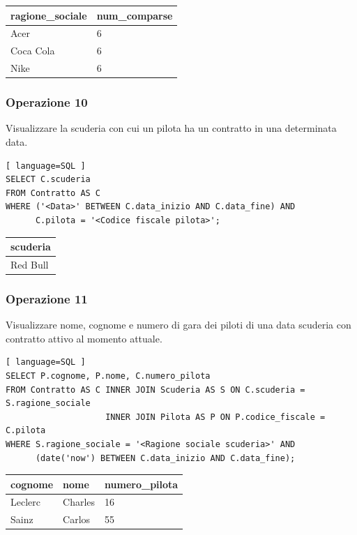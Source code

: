 \documentclass[11pt]{article}
\begin{document}
\begin{table}[H]
    \centering
    \begin{tabular}{|l|l|}
    \hline
        \textbf{ragione\_sociale} & \textbf{num\_comparse} \\ \hline
        Acer & 6 \\ \hline
        Coca Cola & 6 \\ \hline
        Nike & 6 \\ \hline
    \end{tabular}
\end{table}


\subsubsection{Operazione 10}
Visualizzare la scuderia con cui un pilota ha un contratto in una determinata data.
\begin{lstlisting}[ language=SQL ]
SELECT C.scuderia
FROM Contratto AS C
WHERE ('<Data>' BETWEEN C.data_inizio AND C.data_fine) AND
      C.pilota = '<Codice fiscale pilota>';
\end{lstlisting}

\begin{table}[H]
    \centering
    \begin{tabular}{|l|}
    \hline
        \textbf{scuderia} \\ \hline
        Red Bull \\ \hline
    \end{tabular}
\end{table}


\subsubsection{Operazione 11}
Visualizzare nome, cognome e numero di gara dei piloti di una data scuderia con contratto attivo al momento attuale.
\begin{lstlisting}[ language=SQL ]
SELECT P.cognome, P.nome, C.numero_pilota
FROM Contratto AS C INNER JOIN Scuderia AS S ON C.scuderia = S.ragione_sociale 
                    INNER JOIN Pilota AS P ON P.codice_fiscale = C.pilota
WHERE S.ragione_sociale = '<Ragione sociale scuderia>' AND
      (date('now') BETWEEN C.data_inizio AND C.data_fine);
\end{lstlisting}

\begin{table}[H]
    \centering
    \begin{tabular}{|l|l|l|}
    \hline
        \textbf{cognome} & \textbf{nome} & \textbf{numero\_pilota} \\ \hline
        Leclerc & Charles & 16 \\ \hline
        Sainz & Carlos & 55 \\ \hline
    \end{tabular}
\end{table}
\end{document}
